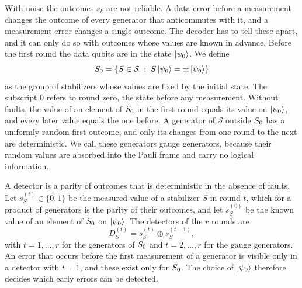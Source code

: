 With noise the outcomes $s_k$ are not reliable. A data error before a measurement changes the outcome of every generator that anticommutes with it, and a measurement error changes a single outcome. The decoder has to tell these apart, and it can only do so with outcomes whose values are known in advance. Before the first round the data qubits are in the state $\left|\psi_0\right\rangle$. We define
\begin{equation}
  S_0=\left\{S\in\mathcal{S}\;:\;S\left|\psi_0\right\rangle=\pm\left|\psi_0\right\rangle\right\}
  \label{eq:S0}
\end{equation}
as the group of stabilizers whose values are fixed by the initial state. The subscript $0$ refers to round zero, the state before any measurement. Without faults, the value of an element of $S_0$ in the first round equals its value on $\left|\psi_0\right\rangle$, and every later value equals the one before. A generator of $\mathcal{S}$ outside $S_0$ has a uniformly random first outcome, and only its changes from one round to the next are deterministic. We call these generators gauge generators, because their random values are absorbed into the Pauli frame and carry no logical information.

A detector is a parity of outcomes that is deterministic in the absence of faults. Let $s_S^{(t)}\in\{0,1\}$ be the measured value of a stabilizer $S$ in round $t$, which for a product of generators is the parity of their outcomes, and let $s_S^{(0)}$ be the known value of an element of $S_0$ on $\left|\psi_0\right\rangle$. The detectors of the $r$ rounds are
\begin{equation}
  D_S^{(t)}=s_S^{(t)}\oplus s_S^{(t-1)},
  \label{eq:detectors}
\end{equation}
with $t=1,\dots,r$ for the generators of $S_0$ and $t=2,\dots,r$ for the gauge generators.
An error that occurs before the first measurement of a generator is visible only in a detector with $t=1$, and these exist only for $S_0$. The choice of $\left|\psi_0\right\rangle$ therefore decides which early errors can be detected.

